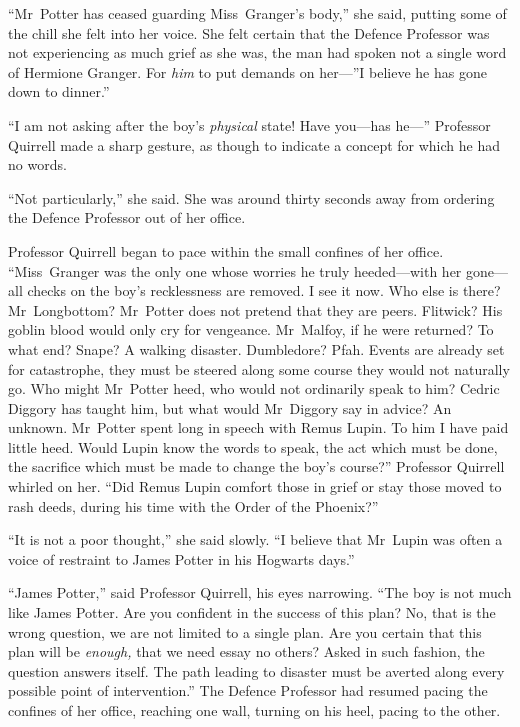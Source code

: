 “Mr~Potter has ceased guarding Miss~Granger’s body,” she said, putting some of
the chill she felt into her voice. She felt certain that the Defence Professor
was not experiencing as much grief as she was, the man had spoken not a single
word of Hermione Granger. For \emph{him} to put demands on her—”I believe he
has gone down to dinner.”

“I am not asking after the boy’s \emph{physical} state! Have you—has he—”
Professor Quirrell made a sharp gesture, as though to indicate a concept for
which he had no words.

“Not particularly,” she said. She was around thirty seconds away from ordering
the Defence Professor out of her office.

Professor Quirrell began to pace within the small confines of her office.
“Miss~Granger was the only one whose worries he truly heeded—with her gone—all
checks on the boy’s recklessness are removed. I see it now. Who else is there?
Mr~Longbottom? Mr~Potter does not pretend that they are peers. Flitwick? His
goblin blood would only cry for vengeance. Mr~Malfoy, if he were returned? To
what end? Snape? A walking disaster. Dumbledore? Pfah. Events are already set
for catastrophe, they must be steered along some course they would not
naturally go. Who might Mr~Potter heed, who would not ordinarily speak to him?
Cedric Diggory has taught him, but what would Mr~Diggory say in advice? An
unknown. Mr~Potter spent long in speech with Remus Lupin. To him I have paid
little heed. Would Lupin know the words to speak, the act which must be done,
the sacrifice which must be made to change the boy’s course?” Professor
Quirrell whirled on her. “Did Remus Lupin comfort those in grief or stay those
moved to rash deeds, during his time with the Order of the Phoenix?”

“It is not a poor thought,” she said slowly. “I believe that Mr~Lupin was
often a voice of restraint to James Potter in his Hogwarts days.”

“James Potter,” said Professor Quirrell, his eyes narrowing. “The boy is not
much like James Potter. Are you confident in the success of this plan? No, that
is the wrong question, we are not limited to a single plan. Are you certain
that this plan will be \emph{enough,} that we need essay no others? Asked in
such fashion, the question answers itself. The path leading to disaster must be
averted along every possible point of intervention.” The Defence Professor had
resumed pacing the confines of her office, reaching one wall, turning on his
heel, pacing to the other.

